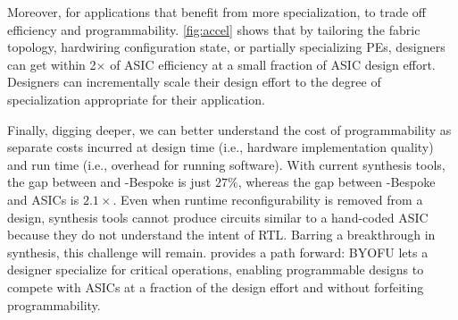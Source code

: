 Moreover, for applications that benefit from more specialization, 
to trade off efficiency and programmability.
%
\autoref{fig:accel} shows that by tailoring the fabric topology,
hardwiring configuration state,
or partially specializing PEs,
designers can get within 2$\times$ of ASIC efficiency
at a small fraction of ASIC design effort.
%
Designers can incrementally scale their design effort
to the degree of specialization appropriate for their application.

Finally, digging deeper, we can better understand the cost of programmability as separate
%
costs incurred at design time (i.e., hardware implementation quality)
and run time (i.e., overhead for running software).
%
With current synthesis tools,
%
the gap between \snafu and {\sc \snafu-Bespoke} is just $27\%$,
%
whereas the gap between {\sc \snafu-Bespoke} and ASICs is $2.1\times$.
% 
Even when runtime reconfigurability is removed from a design,
synthesis tools cannot produce circuits similar to a hand-coded ASIC
because they do not understand the intent of RTL.
%
Barring a breakthrough in synthesis, this challenge will remain. 
% 
\snafu provides a path forward:
% 
{\sc BYOFU} lets a designer specialize for critical operations,
enabling programmable designs to compete with ASICs at a fraction of the design effort
and without forfeiting programmability.
